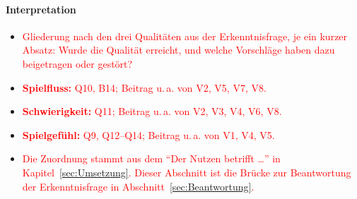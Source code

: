 \documentclass[../Main.tex]{subfiles}
\begin{document}
\paragraph{Interpretation}
\begin{itemize}[leftmargin=1.5cm]
    \item \textcolor{red}{Gliederung nach den drei Qualitäten aus der Erkenntnisfrage, je ein kurzer Absatz: Wurde die Qualität erreicht, und welche Vorschläge haben dazu beigetragen oder gestört?}
    \item \textcolor{red}{\textbf{Spielfluss:} Q10, B14; Beitrag u.\,a. von V2, V5, V7, V8.}
    \item \textcolor{red}{\textbf{Schwierigkeit:} Q11; Beitrag u.\,a. von V2, V3, V4, V6, V8.}
    \item \textcolor{red}{\textbf{Spielgefühl:} Q9, Q12--Q14; Beitrag u.\,a. von V1, V4, V5.}
    \item \textcolor{red}{Die Zuordnung stammt aus dem \enquote{Der Nutzen betrifft \ldots} in Kapitel~\ref{sec:Umsetzung}. Dieser Abschnitt ist die Brücke zur Beantwortung der Erkenntnisfrage in Abschnitt~\ref{sec:Beantwortung}.}
\end{itemize}
\end{document}
